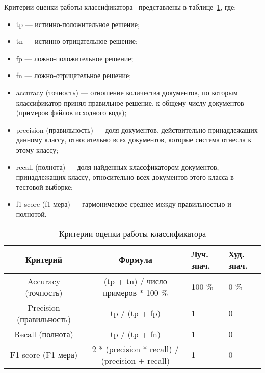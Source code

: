 Критерии оценки работы классификатора~\cite{metrics} представлены в таблице~\ref{tab:eval}, где:
\begin{itemize}
  \item tp --- истинно-положительное решение;
  \item tn --- истинно-отрицательное решение;
  \item fp --- ложно-положительное решение;
  \item fn --- ложно-отрицательное решение;
  \item accuracy (точность) --- отношение количества документов, по которым классификатор принял правильное решение, к общему числу документов (примеров файлов исходного кода); 
  \item precision (правильность) --- доля документов, действительно принадлежащих данному классу, относительно всех документов, которые система отнесла к этому классу;
  \item recall (полнота) --- доля найденных классфикатором документов, принадлежащих классу, относительно всех документов этого класса в тестовой выборке;
  \item f1-score (f1-мера) --- гармоническое среднее между правильностью и полнотой.
\end{itemize}

\begin{table}[h!]
\caption{ Критерии оценки работы классификатора }
\label{tab:eval}
\begin{center}
\begin{tabularx}{\linewidth}{|c|c|X|X|}
\hline
Критерий & Формула & Луч. знач. & Худ. знач. \\
\hline
Accuracy (точность) & (tp + tn) / число примеров * 100 \% & 100 \% & 0 \% \\
\hline
Precision (правильность) & tp / (tp + fp) & 1 & 0 \\
\hline
Recall (полнота) & tp / (tp + fn) & 1 & 0 \\
\hline
F1-score (F1-мера) & 2 * (precision * recall) / (precision + recall) & 1 & 0 \\
\hline
\end{tabularx}
\end{center}
\end{table}
